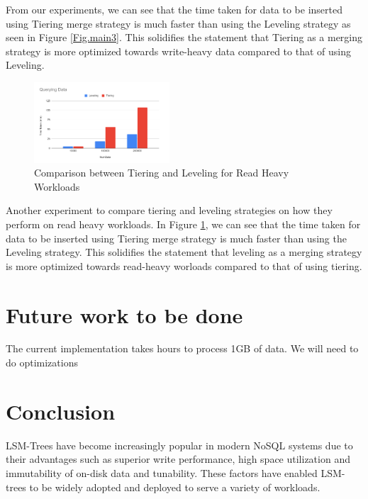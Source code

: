 \documentclass[sigconf]{acmart}
\begin{document}
    From our experiments, we can see that the time taken for data to be inserted using Tiering merge strategy is much faster than using the Leveling strategy as seen in Figure \ref{Fig.main3}. This solidifies the statement that Tiering as a merging strategy is more optimized towards write-heavy data compared to that of using Leveling.
    
    \begin{figure}[H]
        \centering
        \includegraphics[width=0.45\textwidth]{LatencyQuery.PNG}
        \caption{Comparison between Tiering and Leveling for Read Heavy Workloads}
        \label{Fig.main4}
    \end{figure}
    
    Another experiment to compare tiering and leveling strategies on how they perform on read heavy workloads. In Figure \ref{Fig.main4}, we can see that the time taken for data to be inserted using Tiering merge strategy is much faster than using the Leveling strategy. This solidifies the statement that leveling as a merging strategy is more optimized towards read-heavy worloads compared to that of using tiering.

    \section{Future work to be done}

   The current implementation takes hours to process 1GB of data. We will need to do optimizations

    \section{Conclusion}
    
    LSM-Trees have become increasingly popular in modern NoSQL systems due to their advantages such as superior write performance, high space utilization and immutability of on-disk data and tunability. These factors have enabled LSM-trees to be widely adopted and deployed to serve a variety of workloads.
    
\end{document}
